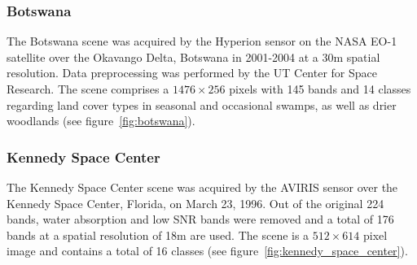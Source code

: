\documentclass[remotesensing,article,submit,moreauthors,pdftex]{Definitions/mdpi}
\begin{document}
\begin{paracol}{2}
\subsubsection*{Botswana}

The Botswana scene was acquired by the Hyperion sensor on the NASA EO-1
satellite over the Okavango Delta, Botswana in 2001-2004 at a 30m spatial
resolution. Data preprocessing was performed by the UT Center for Space
Research. The scene comprises a $1476 \times 256$ pixels with 145 bands and 14
classes regarding land cover types in seasonal and occasional swamps, as well as
drier woodlands (see figure~\ref{fig:botswana}).

\subsubsection*{Kennedy Space Center}

The Kennedy Space Center scene was acquired by the AVIRIS sensor over the
Kennedy Space Center, Florida, on March 23, 1996. Out of the original 224 bands,
water absorption and low SNR bands were removed and a total of 176 bands at a
spatial resolution of 18m are used. The scene is a $512 \times 614$ pixel image
and contains a total of 16 classes (see figure~\ref{fig:kennedy_space_center}).

\end{paracol}
\end{document}
